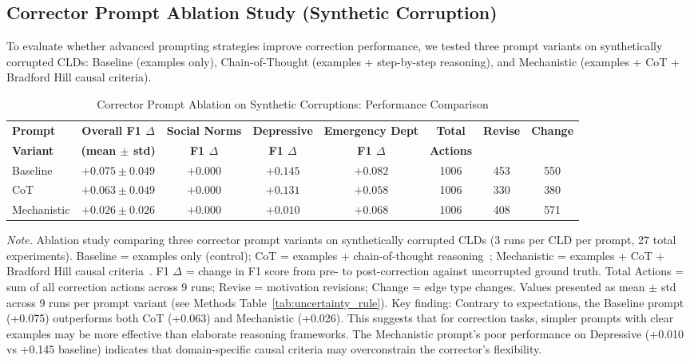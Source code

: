 \documentclass{article}
\begin{document}
\subsection{Corrector Prompt Ablation Study (Synthetic Corruption)}

To evaluate whether advanced prompting strategies improve correction performance, we tested three prompt variants on synthetically corrupted CLDs: Baseline (examples only), Chain-of-Thought (examples + step-by-step reasoning), and Mechanistic (examples + CoT + Bradford Hill causal criteria).

\begin{table}[H]
\centering
\caption{Corrector Prompt Ablation on Synthetic Corruptions: Performance Comparison}
\label{tab:rq1b_prompt_ablation_synthetic}
\begin{threeparttable}
\begin{tabular}{lccccccc}
\toprule
\textbf{Prompt} & \textbf{Overall F1 $\Delta$} & \textbf{Social Norms} & \textbf{Depressive} & \textbf{Emergency Dept} & \textbf{Total} & \textbf{Revise} & \textbf{Change} \\
\textbf{Variant} & \textbf{(mean $\pm$ std)} & \textbf{F1 $\Delta$} & \textbf{F1 $\Delta$} & \textbf{F1 $\Delta$} & \textbf{Actions} & & \\
\midrule
Baseline        & $\mathbf{+0.075 \pm 0.049}$ & $+0.000$ & $\mathbf{+0.145}$ & $+0.082$ & 1006 & 453 & 550 \\
\midrule
CoT             & $+0.063 \pm 0.049$ & $+0.000$ & $+0.131$ & $+0.058$ & 1006 & 330 & 380 \\
\midrule
Mechanistic     & $+0.026 \pm 0.026$ & $+0.000$ & $+0.010$ & $+0.068$ & 1006 & 408 & 571 \\
\bottomrule
\end{tabular}
\begin{tablenotes}
\small
\item \textit{Note.} Ablation study comparing three corrector prompt variants on synthetically corrupted CLDs (3 runs per CLD per prompt, 27 total experiments). 
Baseline = examples only (control); CoT = examples + chain-of-thought reasoning~\citep{kojima2022large}; Mechanistic = examples + CoT + Bradford Hill causal criteria~\citep{shimonovich2020bradford}.
F1 $\Delta$ = change in F1 score from pre- to post-correction against uncorrupted ground truth.
Total Actions = sum of all correction actions across 9 runs; Revise = motivation revisions; Change = edge type changes.
Values presented as mean $\pm$ std across 9 runs per prompt variant (see Methods Table~\ref{tab:uncertainty_rule}).
Key finding: Contrary to expectations, the Baseline prompt (+0.075) outperforms both CoT (+0.063) and Mechanistic (+0.026). This suggests that for correction tasks, simpler prompts with clear examples may be more effective than elaborate reasoning frameworks. The Mechanistic prompt's poor performance on Depressive (+0.010 vs +0.145 baseline) indicates that domain-specific causal criteria may overconstrain the corrector's flexibility.
\end{tablenotes}
\end{threeparttable}
\end{table}
\end{document}
